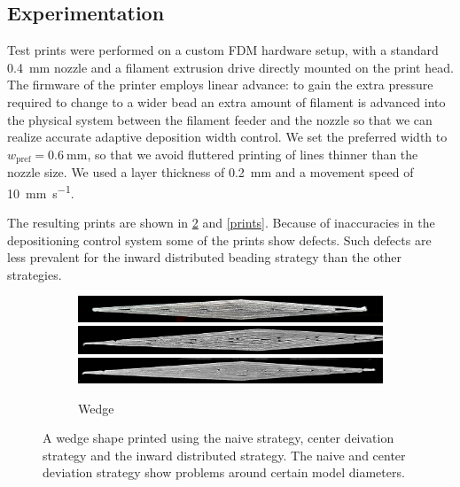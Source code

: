 \subsection{Experimentation}
Test prints were performed on a custom FDM hardware setup, with a standard \SI{0.4}{\milli\meter} nozzle and a filament extrusion drive directly mounted on the print head.
The firmware of the printer employs linear advance: to gain the extra pressure required to change to a wider bead an extra amount of filament is advanced into the physical system between the filament feeder and the nozzle so that we can realize accurate adaptive deposition width control.\cite{tronvoll2019investigating}
We set the preferred width to $w_\text{pref} = \SI{0.6}{\milli\meter}$, so that we avoid fluttered printing of lines thinner than the nozzle size.
We used a layer thickness of \SI{0.2}{\milli\meter} and a movement speed of \SI{10}{\milli\meter\per\second}.

The resulting prints are shown in \cref{wedge_print} and \cref{prints}.
Because of inaccuracies in the depositioning control system some of the prints show defects.
Such defects are less prevalent for the inward distributed beading strategy than the other strategies.


\begin{figure}
\centering
\begin{subfigure}{\columnwidth}\centering
\setlength{\figwidth}{\columnwidth}
\includegraphics[width=\figwidth]{sources/applications/P3_print_wedge_naive_edited.png}
\includegraphics[width=\figwidth]{sources/applications/P3_print_wedge_center_edited.png}
\includegraphics[width=\figwidth]{sources/applications/P3_print_wedge_inward_edited.png}
\caption{Wedge}\label{print_wedge}
\end{subfigure}
\caption{
A wedge shape printed using the naive strategy, center deivation strategy and the inward distributed strategy.
The naive and center deviation strategy show problems around certain model diameters.
}
\label{wedge_print}
\end{figure}


